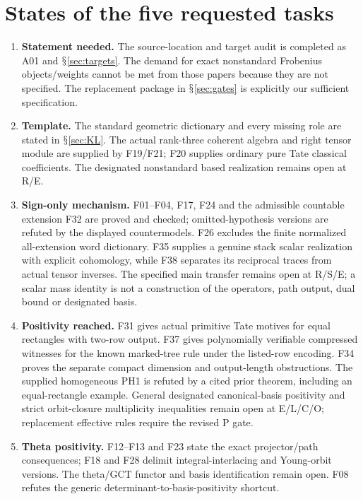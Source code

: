 \documentclass[11pt,a4paper]{article}
\renewcommand{\S}{\ensuremath{\mathsection}}
\theoremstyle{named}\newtheorem{finding}{Finding}[section]
\theoremstyle{definition}\newtheorem{definition}[finding]{Definition}
\theoremstyle{remark}\newtheorem{remark}[finding]{Remark}
\begin{document}
\section{States of the five requested tasks}
\begin{enumerate}
\item \textbf{Statement needed.} The source-location and target audit is completed as A01 and \S\ref{sec:targets}. The demand for exact nonstandard Frobenius objects/weights cannot be met from those papers because they are not specified. The replacement package in \S\ref{sec:gates} is explicitly our sufficient specification.
\item \textbf{Template.} The standard geometric dictionary and every missing role are stated in \S\ref{sec:KL}. The actual rank-three coherent algebra and right tensor module are supplied by F19/F21; F20 supplies ordinary pure Tate classical coefficients. The designated nonstandard based realization remains open at R/E.
\item \textbf{Sign-only mechanism.} F01--F04, F17, F24 and the admissible countable extension F32 are proved and checked; omitted-hypothesis versions are refuted by the displayed countermodels. F26 excludes the finite normalized all-extension word dictionary. F35 supplies a genuine stack scalar realization with explicit cohomology, while F38 separates its reciprocal traces from actual tensor inverses. The specified main transfer remains open at R/S/E; a scalar mass identity is not a construction of the operators, path output, dual bound or designated basis.
\item \textbf{Positivity reached.} F31 gives actual primitive Tate motives for equal rectangles with two-row output. F37 gives polynomially verifiable compressed witnesses for the known marked-tree rule under the listed-row encoding. F34 proves the separate compact dimension and output-length obstructions. The supplied homogeneous PH1 is refuted by a cited prior theorem, including an equal-rectangle example. General designated canonical-basis positivity and strict orbit-closure multiplicity inequalities remain open at E/L/C/O; replacement effective rules require the revised P gate.
\item \textbf{Theta positivity.} F12--F13 and F23 state the exact projector/path consequences; F18 and F28 delimit integral-interlacing and Young-orbit versions. The theta/GCT functor and basis identification remain open. F08 refutes the generic determinant-to-basis-positivity shortcut.
\end{enumerate}
\end{document}
